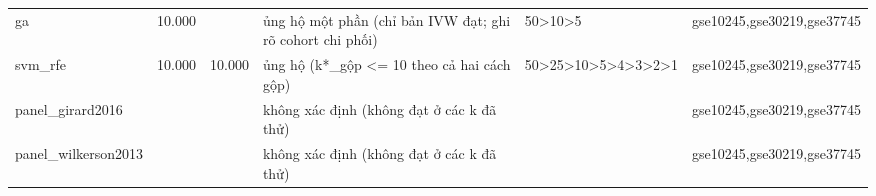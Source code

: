 \begin{table}[t]
\begin{tabular}{llllll}
    ga & 10.000 &  & ủng hộ một phần (chỉ bản IVW đạt; ghi rõ cohort chi phối) & 50>10>5 & gse10245,gse30219,gse37745 \\
    svm\_rfe & 10.000 & 10.000 & ủng hộ (k*\_gộp <= 10 theo cả hai cách gộp) & 50>25>10>5>4>3>2>1 & gse10245,gse30219,gse37745 \\
    panel\_girard2016 &  &  & không xác định (không đạt ở các k đã thử) &  & gse10245,gse30219,gse37745 \\
    panel\_wilkerson2013 &  &  & không xác định (không đạt ở các k đã thử) &  & gse10245,gse30219,gse37745 \\
    \bottomrule
  \end{tabular}
\end{table}
